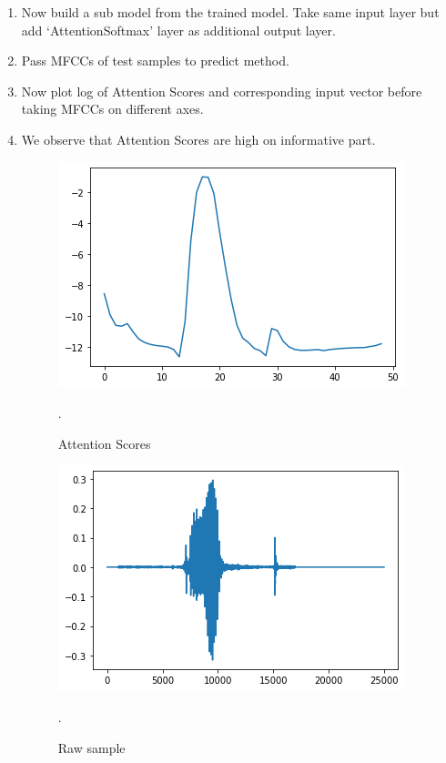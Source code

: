 \documentclass[11pt,english]{article}
\begin{document}
\begin{enumerate}
    \item Now build a sub model from the trained model. Take same input layer but add ‘AttentionSoftmax’ layer as additional output layer.
    \item Pass MFCCs of test samples to predict method.
    \item Now plot log of Attention Scores and corresponding input vector before taking MFCCs on different axes.
    \item We observe that Attention Scores are high on informative part.
    \begin{figure}[!ht]
    \centering
    \includegraphics[width=\columnwidth]{./Figs/Attention.png}
    \caption{ Attention Scores}.
    \label{fig: Attention}	
    \end{figure}
    \begin{figure}[!ht]
    \centering
    \includegraphics[width=\columnwidth]{./Figs/Sample.png}
    \caption{ Raw sample}.
    \label{fig: Sample}	
    \end{figure}
    
\end{enumerate}
\end{document}
